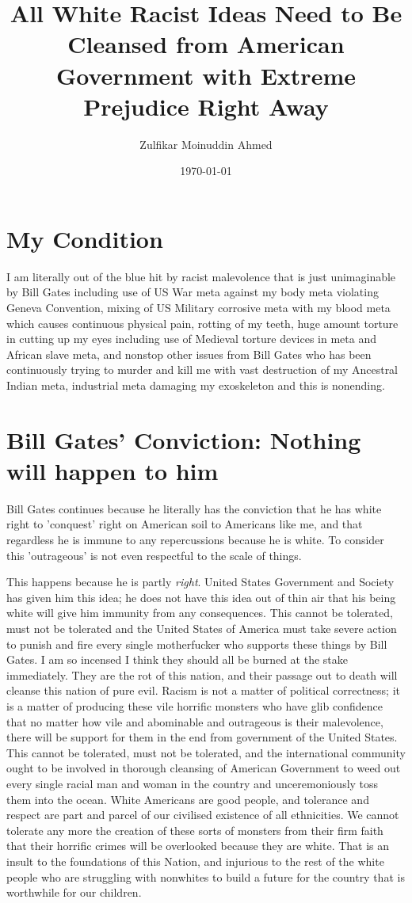 \documentclass{amsart}
\title{All White Racist Ideas Need to Be Cleansed from American Government with Extreme Prejudice Right Away}
\author{Zulfikar Moinuddin Ahmed}
\date{\today}
\begin{document}
\maketitle

\section{My Condition}

I am literally out of the blue hit by racist malevolence that is just unimaginable by Bill Gates including use of US War meta against my body meta violating Geneva Convention, mixing of US Military corrosive meta with my blood meta which causes continuous physical pain, rotting of my teeth, huge amount torture in cutting up my eyes including use of Medieval torture devices in meta and African slave meta, and nonstop other issues from Bill Gates who has been continuously trying to murder and kill me with vast destruction of my Ancestral Indian meta, industrial meta damaging my exoskeleton and this is nonending.

\section{Bill Gates' Conviction:  Nothing will happen to him}

Bill Gates continues because he literally has the conviction that he has white right to 'conquest' right on American soil to Americans like me, and that regardless he is immune to any repercussions because he is white.  To consider this 'outrageous' is not even respectful to the scale of things. 

This happens because he is partly {\em right}.  United States Government and Society has given him this idea; he does not have this idea out of thin air that his being white will give him immunity from any consequences.  This cannot be tolerated, must not be tolerated and the United States of America must take severe action to punish and fire every single motherfucker who supports these things by Bill Gates.  I am so incensed I think they should all be burned at the stake immediately.  They are the rot of this nation, and their passage out to death will cleanse this nation of pure evil.  Racism is not a matter of political correctness; it is a matter of producing these vile horrific monsters who have glib confidence that no matter how vile and abominable and outrageous is their malevolence, there will be support for them in the end from government of the United States.  This cannot be tolerated, must not be tolerated, and the international community ought to be involved in thorough cleansing of American Government to weed out every single racial man and woman in the country and unceremoniously toss them into the ocean.  White Americans are good people, and tolerance and respect are part and parcel of our civilised existence of all ethnicities.  We cannot tolerate any more the creation of these sorts of monsters from their firm faith that their horrific crimes will be overlooked because they are white.  That is an insult to the foundations of this Nation, and injurious to the rest of the white people who are struggling with nonwhites to build a future for the country that is worthwhile for our children.
\end{document}
